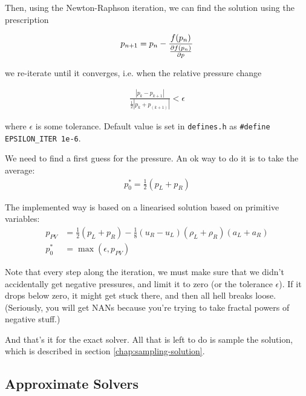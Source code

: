 Then, using the Newton-Raphson iteration, we can find the solution using the prescription

\begin{align}
	p_{n+1} = p_n - \frac{f(p_n)}{\frac{\partial f(p_n)}{\partial p}}
\end{align}


we re-iterate until it converges, i.e. when the relative pressure change 

\begin{align}
	\frac{|p_k - p_{k+1}|}{\frac{1}{2} | p_k + p_(k+1) | } < \epsilon
\end{align}

where $\epsilon$ is some tolerance. Default value is set in \texttt{defines.h} as \verb|#define EPSILON_ITER 1e-6|.


We need to find a first guess for the pressure. 
An ok way to do it is to take the average:
\begin{align*}
	p_0^* = \frac{1}{2} (p_L + p_R)
\end{align*}

The implemented way is based on a linearised solution based on primitive variables:
\begin{align*}
	p_{PV} &= \frac{1}{2} (p_L + p_R) - \frac{1}{8} (u_R - u_L)(\rho_L + \rho_R)(a_L + a_R)\\
	p_0^* &= \max(\epsilon, p_{PV})
\end{align*}

Note that every step along the iteration, we must make sure that we didn't accidentally get negative pressures, and limit it to zero (or the tolerance $\epsilon$). 
If it drops below zero, it might get stuck there, and then all hell breaks loose.
(Seriously, you will get NANs because you're trying to take fractal powers of negative stuff.)


And that's it for the exact solver.
All that is left to do is sample the solution, which is described in section \ref{chap:sampling-solution}.






\subsection{Approximate Solvers}



